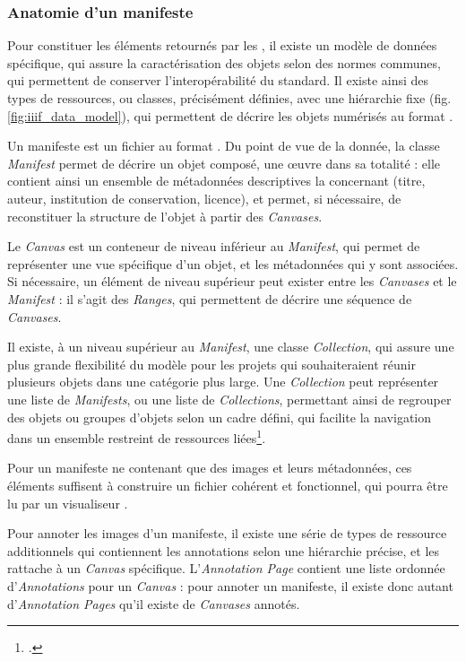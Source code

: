     \subsubsection{Anatomie d'un manifeste}
	Pour constituer les éléments retournés par les \api \iiif, il existe un modèle de données spécifique, qui assure la caractérisation des objets selon des normes communes, qui permettent de conserver l'interopérabilité du standard. Il existe ainsi des types de ressources, ou classes, précisément définies, avec une hiérarchie fixe (fig. \ref{fig:iiif_data_model}), qui permettent de décrire les objets numérisés au format \json.
	
	Un manifeste est un fichier au format \json. Du point de vue de la donnée, la classe \textit{Manifest} permet de décrire un objet composé, une œuvre dans sa totalité : elle contient ainsi un ensemble de métadonnées descriptives la concernant (titre, auteur, institution de conservation, licence), et permet, si nécessaire, de reconstituer la structure de l'objet à partir des \textit{Canvases}.
	
	Le \textit{Canvas} est un conteneur de niveau inférieur au \textit{Manifest}, qui permet de représenter une vue spécifique d'un objet, et les métadonnées qui y sont associées. Si nécessaire, un élément de niveau supérieur peut exister entre les \textit{Canvases} et le \textit{Manifest} : il s'agit des \textit{Ranges}, qui permettent de décrire une séquence de \textit{Canvases}.
	
	Il existe, à un niveau supérieur au \textit{Manifest}, une classe \textit{Collection}, qui assure une plus grande flexibilité du modèle pour les projets qui souhaiteraient réunir plusieurs objets dans une catégorie plus large. Une \textit{Collection} peut représenter une liste de \textit{Manifests}, ou une liste de \textit{Collections}, permettant ainsi de regrouper des objets ou groupes d'objets selon un cadre défini, qui facilite la navigation dans un ensemble restreint de ressources liées\footcite{PresentationAPI}.
	
	Pour un manifeste ne contenant que des images et leurs métadonnées, ces éléments suffisent à construire un fichier cohérent et fonctionnel, qui pourra être lu par un visualiseur \iiif.
	
	Pour annoter les images d'un manifeste, il existe une série de types de ressource additionnels qui contiennent les annotations selon une hiérarchie précise, et les rattache à un \textit{Canvas} spécifique. L'\textit{Annotation Page} contient une liste ordonnée d'\textit{Annotations} pour un \textit{Canvas} : pour annoter un manifeste, il existe donc autant d'\textit{Annotation Pages} qu'il existe de \textit{Canvases} annotés.
	
